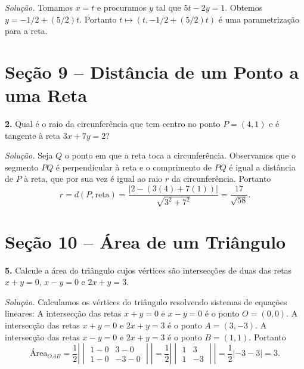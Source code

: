 \documentclass[a4paper,11pt]{article}
\begin{document}
\emph{Solução.}
Tomamos $x = t$ e procuramos $y$ tal que $5t - 2y = 1$.
Obtemos $y = -1/2 + (5/2)t$.
Portanto $t \mapsto (t, -1/2 + (5/2)t)$ é uma parametrização para a reta.

\section*{Seção 9 -- Distância de um Ponto a uma Reta}

\textbf{2.}
Qual é o raio da circunferência que tem centro no ponto $P = (4,1)$ e é tangente à reta $3x + 7y = 2$?

\vspace{\baselineskip}

\emph{Solução.}
Seja $Q$ o ponto em que a reta toca a circunferência.
Observamos que o segmento $PQ$ é perpendicular à reta e o comprimento de $PQ$ é igual a distância de $P$ à reta, que por sua vez é igual ao raio $r$ da circunferência.
Portanto
\[
  r = d(P,\mathrm{reta}) = \frac{|2-(3(4) + 7(1))|}{\sqrt{3^2 + 7^2}} = \frac{17}{\sqrt{58}}.
\]

\vspace{\baselineskip}

\section*{Seção 10 -- Área de um Triângulo}

\textbf{5.}
Calcule a área do triângulo cujos vértices são intersecções de duas das retas $x+y=0$, $x-y=0$ e $2x+y=3$.

\vspace{\baselineskip}

\emph{Solução.}
Calculamos os vértices do triângulo resolvendo sistemas de equações lineares:
A intersecção das retas $x+y=0$ e $x-y=0$ é o ponto $O = (0,0)$.
A intersecção das retas $x+y=0$ e $2x+y=3$ é o ponto $A = (3,-3)$.
A intersecção das retas $x-y=0$ e $2x+y=3$ é o ponto $B = (1,1)$.
Portanto
\[
  \text{Área}_{OAB} =
  \frac{1}{2} \left|
  \begin{vmatrix}
    1-0 & 3-0 \\
    1-0 & -3-0
  \end{vmatrix}
  \right|
  =
  \frac{1}{2} \left|
  \begin{vmatrix}
    1 & 3 \\
    1 & -3
  \end{vmatrix}
  \right|
  = \frac{1}{2} |-3-3| = 3.
\]

\vspace{\baselineskip}
\end{document}
